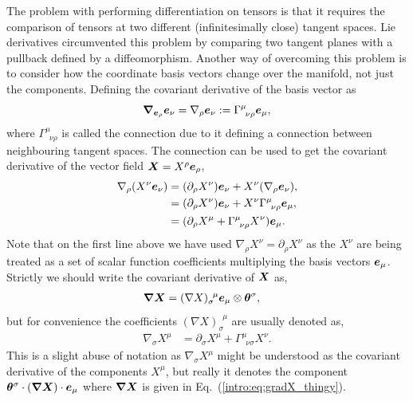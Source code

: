 The problem with performing differentiation on tensors is that it requires the comparison of tensors at two different (infinitesimally close) tangent spaces. Lie derivatives circumvented this problem by comparing two tangent planes with a pullback defined by a diffeomorphism. Another way of overcoming this problem is to consider how the coordinate basis vectors change over the manifold, not just the components. Defining the covariant derivative of the basis vector as
\begin{equation}
\boldsymbol{\nabla}_{\boldsymbol{e}_\rho} \boldsymbol{e}_\nu = \nabla_\rho \boldsymbol{e}_\nu := \Gamma^\mu_{\,\,\,\nu\rho}\boldsymbol{e}_\mu,
\end{equation}
where $\Gamma^\mu_{\,\,\,\nu\rho}$ is called the connection due to it defining a connection between neighbouring tangent spaces. The connection can be used to get the covariant derivative of the vector field $\boldsymbol{X}=X^\rho \boldsymbol{e}_\rho$,
\begin{align}
\nabla_\rho (X^\nu \boldsymbol{e}_\nu) &= (\partial_\rho X^\nu )\boldsymbol{e}_\nu + X^\nu (\nabla_\rho \boldsymbol{e}_\nu),\\
&= (\partial_\rho X^\nu )\boldsymbol{e}_\nu + X^\nu \Gamma^\mu_{\,\,\,\nu\rho}\boldsymbol{e}_\mu,\\
&= (\partial_\rho X^\mu + \Gamma^\mu_{\,\,\,\nu\rho} X^\nu )\boldsymbol{e}_\mu.
\end{align}
Note that on the first line above we have used $\nabla_\rho X^\nu=\partial_\rho X^\nu$ as the $X^\nu$ are being treated as a set of scalar function coefficients multiplying the basis vectors $\boldsymbol{e}_\mu$. Strictly we should write the covariant derivative of $\boldsymbol{X}$ as, 
\begin{align}\label{intro:eq:gradX_thingy}
\boldsymbol{\nabla X} &= (\nabla X)^{\,\,\,\mu}_\sigma \boldsymbol{e}_\mu \otimes \boldsymbol{\theta}^\sigma, 
\end{align}
but for convenience the coefficients $(\nabla X)^{\,\,\,\mu}_\sigma$ are usually denoted as, 
\begin{align}
{\nabla}_{\sigma} X^\mu &= \partial_\sigma X^\mu + \Gamma^\mu_{\,\,\,\nu\sigma} X^\nu.
\end{align}
This is a slight abuse of notation as $\nabla_\sigma X^\mu$ might be understood as the covariant derivative of the components $X^\mu$, but really it denotes the component $\boldsymbol{\theta}^\sigma\cdot(\boldsymbol{\nabla X})\cdot \boldsymbol{e}_\mu$ where $\boldsymbol{\nabla X}$ is given in Eq.~(\ref{intro:eq:gradX_thingy}).

